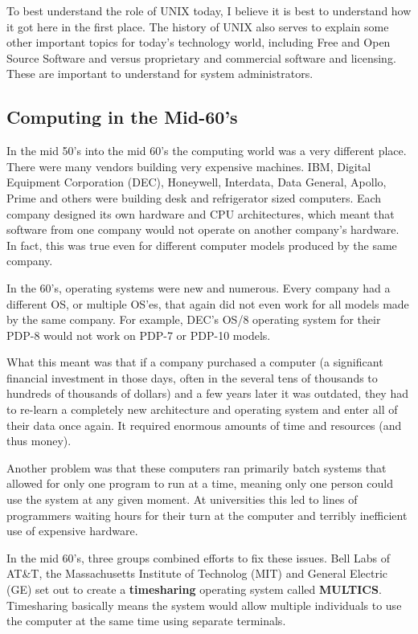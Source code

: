 To best understand the role of UNIX today, I believe it is best to understand how it got here in the first place. The history of UNIX also serves to explain some other important topics for today's technology world, including Free and Open Source Software and versus proprietary and commercial software and licensing. These are important to understand for system administrators.

\subsection{Computing in the Mid-60's}

In the mid 50's into the mid 60's the computing world was a very different place.  There were many vendors building very expensive machines.  IBM, Digital Equipment Corporation (DEC), Honeywell, Interdata, Data General, Apollo, Prime and others were building desk and refrigerator sized computers.  Each company designed its own hardware and CPU architectures, which meant that software from one company would not operate on another company's hardware.  In fact, this was true even for different computer models produced by the same company.

In the 60's, operating systems were new and numerous.  Every company had a different OS, or multiple OS'es, that again did not even work for all models made by the same company.  For example, DEC's OS/8 operating system for their PDP-8 would not work on PDP-7 or PDP-10 models.

What this meant was that if a company purchased a computer (a significant financial investment in those days, often in the several tens of thousands to hundreds of thousands of dollars) and a few years later it was outdated, they had to re-learn a completely new architecture and operating system and enter all of their data once again.  It required enormous amounts of time and resources (and thus money).

Another problem was that these computers ran primarily batch systems that allowed for only one program to run at a time, meaning only one person could use the system at any given moment. At universities this led to lines of programmers waiting hours for their turn at the computer and terribly inefficient use of expensive hardware.

In the mid 60's, three groups combined efforts to fix these issues. Bell Labs of AT\&T, the Massachusetts Institute of Technolog (MIT) and General Electric (GE) set out to create a \textbf{timesharing} operating system called \textbf{MULTICS}. Timesharing basically means the system would allow multiple individuals to use the computer at the same time using separate terminals.

